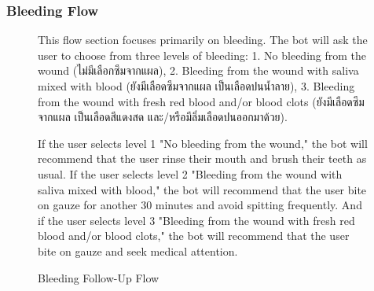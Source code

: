 \documentclass[12pt,oneside,openright,a4paper]{cpe-english-project}
\begin{document}
        \subsubsection{Bleeding Flow}
          \begin{figure}[H]
            \centering
            \caption{Bleeding Follow-Up Flow}\label{fig:FollowUpFlow2}
            \begin{justify}
              \qquad This flow section focuses primarily on bleeding. The bot will ask the user to choose from three levels of bleeding: 1. No bleeding from the wound \textthai{(ไม่มีเลือกซึมจากแผล)}, 2. Bleeding from the wound with saliva mixed with blood \textthai{(ยังมีเลือดซึมจากแผล เป็นเลือดปนน้ำลาย)}, 3. Bleeding from the wound with fresh red blood and/or blood clots \textthai{(ยังมีเลือดซึมจากแผล เป็นเลือดสีแดงสด และ/หรือมีลิ่มเลือดปนออกมาด้วย)}.\par
              \qquad If the user selects level 1 "No bleeding from the wound," the bot will recommend that the user rinse their mouth and brush their teeth as usual. If the user selects level 2 "Bleeding from the wound with saliva mixed with blood," the bot will recommend that the user bite on gauze for another 30 minutes and avoid spitting frequently. And if the user selects level 3 "Bleeding from the wound with fresh red blood and/or blood clots," the bot will recommend that the user bite on gauze and seek medical attention.\par
            \end{justify}        
          \end{figure}
\end{document}
